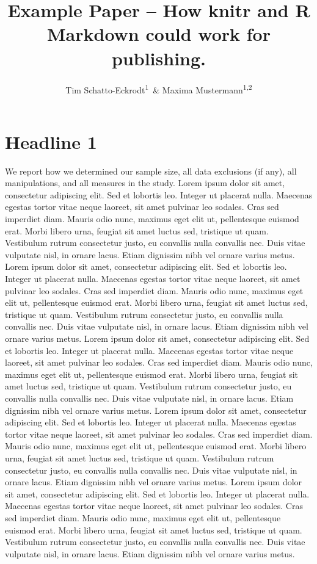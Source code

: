 \documentclass[floatsintext,man]{apa6}
\title{Example Paper -- How knitr and R Markdown could work for publishing.}
\author{Tim Schatto-Eckrodt\textsuperscript{1}~\& Maxima Mustermann\textsuperscript{1,2}}
\affiliation{
    \vspace{0.5cm}
          \textsuperscript{1} Westfälische-Wilhelms Universität Münster\\
          \textsuperscript{2} Konstanz Business School  }
\theoremstyle{definition}
\theoremstyle{definition}
\theoremstyle{definition}
\theoremstyle{remark}
\begin{document}
\maketitle

\setcounter{secnumdepth}{0}



\hypertarget{headline-1}{%
\section{Headline 1}\label{headline-1}}

We report how we determined our sample size, all data exclusions (if
any), all manipulations, and all measures in the study. Lorem ipsum
dolor sit amet, consectetur adipiscing elit. Sed et lobortis leo.
Integer ut placerat nulla. Maecenas egestas tortor vitae neque laoreet,
sit amet pulvinar leo sodales. Cras sed imperdiet diam. Mauris odio
nunc, maximus eget elit ut, pellentesque euismod erat. Morbi libero
urna, feugiat sit amet luctus sed, tristique ut quam. Vestibulum rutrum
consectetur justo, eu convallis nulla convallis nec. Duis vitae
vulputate nisl, in ornare lacus. Etiam dignissim nibh vel ornare varius
metus. Lorem ipsum dolor sit amet, consectetur adipiscing elit. Sed et
lobortis leo. Integer ut placerat nulla. Maecenas egestas tortor vitae
neque laoreet, sit amet pulvinar leo sodales. Cras sed imperdiet diam.
Mauris odio nunc, maximus eget elit ut, pellentesque euismod erat. Morbi
libero urna, feugiat sit amet luctus sed, tristique ut quam. Vestibulum
rutrum consectetur justo, eu convallis nulla convallis nec. Duis vitae
vulputate nisl, in ornare lacus. Etiam dignissim nibh vel ornare varius
metus. Lorem ipsum dolor sit amet, consectetur adipiscing elit. Sed et
lobortis leo. Integer ut placerat nulla. Maecenas egestas tortor vitae
neque laoreet, sit amet pulvinar leo sodales. Cras sed imperdiet diam.
Mauris odio nunc, maximus eget elit ut, pellentesque euismod erat. Morbi
libero urna, feugiat sit amet luctus sed, tristique ut quam. Vestibulum
rutrum consectetur justo, eu convallis nulla convallis nec. Duis vitae
vulputate nisl, in ornare lacus. Etiam dignissim nibh vel ornare varius
metus. Lorem ipsum dolor sit amet, consectetur adipiscing elit. Sed et
lobortis leo. Integer ut placerat nulla. Maecenas egestas tortor vitae
neque laoreet, sit amet pulvinar leo sodales. Cras sed imperdiet diam.
Mauris odio nunc, maximus eget elit ut, pellentesque euismod erat. Morbi
libero urna, feugiat sit amet luctus sed, tristique ut quam. Vestibulum
rutrum consectetur justo, eu convallis nulla convallis nec. Duis vitae
vulputate nisl, in ornare lacus. Etiam dignissim nibh vel ornare varius
metus. Lorem ipsum dolor sit amet, consectetur adipiscing elit. Sed et
lobortis leo. Integer ut placerat nulla. Maecenas egestas tortor vitae
neque laoreet, sit amet pulvinar leo sodales. Cras sed imperdiet diam.
Mauris odio nunc, maximus eget elit ut, pellentesque euismod erat. Morbi
libero urna, feugiat sit amet luctus sed, tristique ut quam. Vestibulum
rutrum consectetur justo, eu convallis nulla convallis nec. Duis vitae
vulputate nisl, in ornare lacus. Etiam dignissim nibh vel ornare varius
metus.
\end{document}
